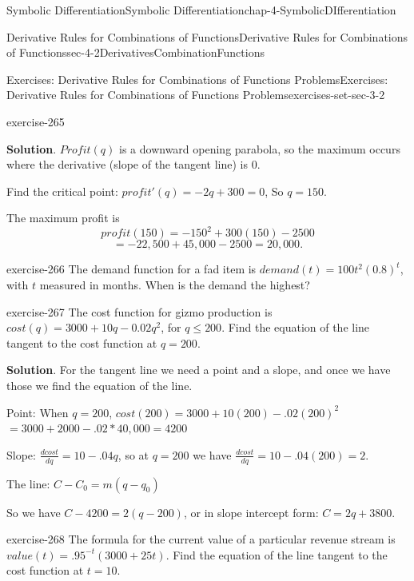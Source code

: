\documentclass[oneside,10pt,]{book}
\numberwithin{equation}{section}
\begin{document}
\begin{chapterptx}{Symbolic Differentiation}{}{Symbolic Differentiation}{}{}{chap-4-SymbolicDIfferentiation}
\begin{sectionptx}{Derivative Rules for Combinations of Functions}{}{Derivative Rules for Combinations of Functions}{}{}{sec-4-2DerivativesCombinationFunctions}
\begin{exercises-subsection}{Exercises: Derivative Rules for Combinations of Functions Problems}{}{Exercises: Derivative Rules for Combinations of Functions Problems}{}{}{exercises-set-sec-3-2}
\begin{divisionexercise}{23}{}{}{exercise-265}
\par\smallskip%
\noindent\textbf{Solution}.\hypertarget{solution-132}{}\quad%
\hypertarget{p-1603}{}%
\(Profit (q)\) is a downward opening parabola, so the maximum occurs where the derivative (slope of the tangent line) is 0.%
\par
\hypertarget{p-1604}{}%
Find the critical point: \(profit' (q)=-2q+300=0\), So \(q = 150\).%
\par
\hypertarget{p-1605}{}%
The maximum profit is%
%
\begin{equation*}
profit(150)=-150^2+300(150)-2500
\end{equation*}
%
\begin{equation*}
=-22,500+45,000-2500=20,000.
\end{equation*}
\end{divisionexercise}%
\begin{divisionexercise}{24}{}{}{exercise-266}%
\hypertarget{p-1606}{}%
The demand function for a fad item is \(demand(t)=100t^2 (0.8)^t\), with \(t\) measured in months.  When is the demand the highest?%
\end{divisionexercise}%
\begin{divisionexercise}{25}{}{}{exercise-267}%
\hypertarget{p-1607}{}%
The cost function for gizmo production is \(cost(q)=3000+10q-0.02q^2\), for \(q\le200\).  Find the equation of the line tangent to the cost function at \(q=200\).%
\par\smallskip%
\noindent\textbf{Solution}.\hypertarget{solution-133}{}\quad%
\hypertarget{p-1608}{}%
For the tangent line we need a point and a slope, and once we have those we find the equation of the line.%
\par
\hypertarget{p-1609}{}%
Point: When \(q = 200\), \(cost(200)=3000+10(200)-.02(200)^2\) \(=3000+2000-.02*40,000=4200\)%
\par
\hypertarget{p-1610}{}%
Slope: \(\frac{dcost}{dq}=10-.04q\), so at \(q = 200\) we have  \(\frac{dcost}{dq}=10-.04(200)= 2\).%
\par
\hypertarget{p-1611}{}%
The line: \(C-C_0=m(q-q_0)\)%
\par
\hypertarget{p-1612}{}%
So we have \(C-4200=2(q-200)\), or in slope intercept form: \(C=2q+3800\).%
\end{divisionexercise}%
\begin{divisionexercise}{26}{}{}{exercise-268}%
\hypertarget{p-1613}{}%
The formula for the current value of a particular revenue stream is \(value(t)=.95^{-t} (3000+25t)\).  Find the equation of the line tangent to the cost function at \(t=10\).%

\end{divisionexercise}
\end{exercises-subsection}
\end{sectionptx}
\end{chapterptx}
\end{document}
